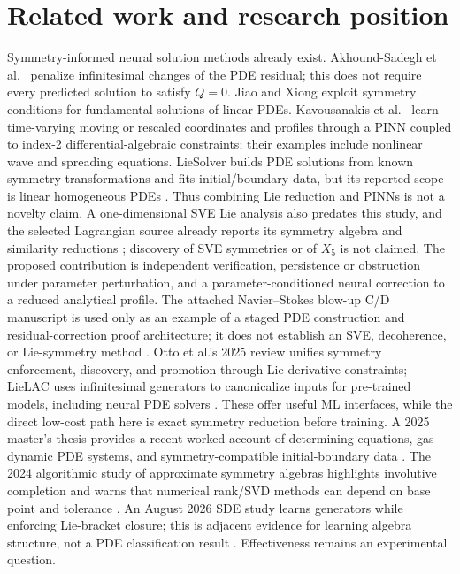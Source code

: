\documentclass[11pt]{article}
\begin{document}
\section{Related work and research position}
Symmetry-informed neural solution methods already exist. Akhound-Sadegh
et al.\ \cite{sympinn} penalize infinitesimal changes of the PDE residual;
this does not require every predicted solution to satisfy $Q=0$.
Jiao and Xiong \cite{jiao} exploit symmetry conditions for fundamental
solutions of linear PDEs. Kavousanakis et al.\ \cite{flow} learn time-varying
moving or rescaled coordinates and profiles through a PINN coupled to
index-2 differential-algebraic constraints; their examples include nonlinear
wave and spreading equations. LieSolver builds PDE solutions from known
symmetry transformations and fits initial/boundary data, but its reported
scope is linear homogeneous PDEs \cite{liesolver}. Thus combining Lie
reduction and PINNs is not a novelty claim. A one-dimensional SVE Lie analysis
also predates this study, and the selected Lagrangian source already reports
its symmetry algebra and similarity reductions \cite{sveold,ap}; discovery of
SVE symmetries or of $X_5$ is not claimed. The proposed contribution is
independent verification, persistence or obstruction under parameter
perturbation, and a parameter-conditioned neural correction to a reduced
analytical profile. The attached Navier--Stokes blow-up C/D manuscript is
used only as an example of a staged PDE construction and residual-correction
proof architecture; it does not establish an SVE, decoherence, or Lie-symmetry
method \cite{naviercd}. Otto et al.'s 2025 review unifies symmetry enforcement,
discovery, and promotion through Lie-derivative constraints; LieLAC uses
infinitesimal generators to canonicalize inputs for pre-trained models,
including neural PDE solvers \cite{otto,lieLAC}. These offer useful ML
interfaces, while the direct low-cost path here is exact symmetry reduction
before training. A 2025 master's thesis provides a recent worked account of
determining equations, gas-dynamic PDE systems, and symmetry-compatible
initial-boundary data \cite{beligiannis}. The 2024 algorithmic study of
approximate symmetry algebras highlights involutive completion and warns that
numerical rank/SVD methods can depend on base point and tolerance
\cite{approxalg}. An August 2026 SDE study learns generators while enforcing
Lie-bracket closure; this is adjacent evidence for learning algebra structure,
not a PDE classification result \cite{liestonet}. Effectiveness remains an
experimental question.
\end{document}
